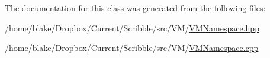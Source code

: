 The documentation for this class was generated from the following files\-:\begin{DoxyCompactItemize}
\item 
/home/blake/\-Dropbox/\-Current/\-Scribble/src/\-V\-M/\hyperlink{_v_m_namespace_8hpp}{V\-M\-Namespace.\-hpp}\item 
/home/blake/\-Dropbox/\-Current/\-Scribble/src/\-V\-M/\hyperlink{_v_m_namespace_8cpp}{V\-M\-Namespace.\-cpp}\end{DoxyCompactItemize}
